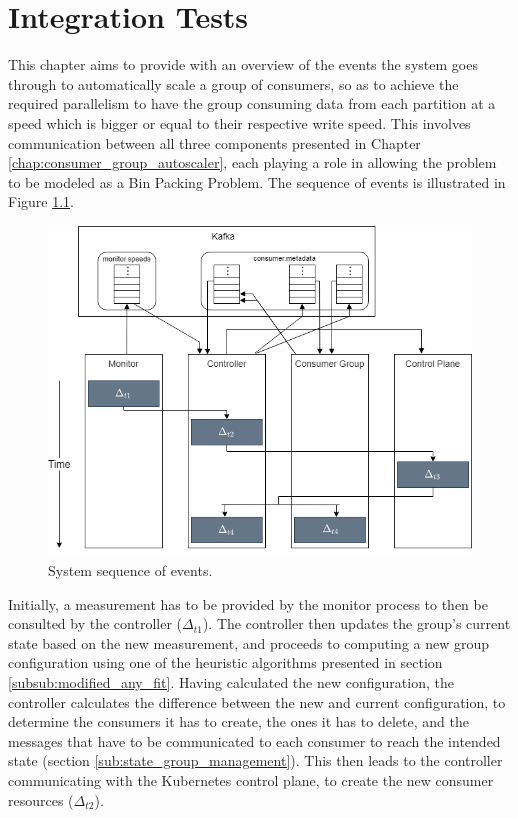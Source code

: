 \chapter{Integration Tests} 
\label{chap:integration_tests}

This chapter aims to provide with an overview of the events the system goes
through to automatically scale a group of consumers, so as to achieve the
required parallelism to have the group consuming data from each partition at a
speed which is bigger or equal to their respective write speed. This involves
communication between all three components presented in Chapter
\ref{chap:consumer_group_autoscaler}, each playing a role in allowing the
problem to be modeled as a Bin Packing Problem. The sequence of events is
illustrated in Figure \ref{fig:step_event_sequence}.

\begin{figure}[htb!]
\centering
\includegraphics[width=\textwidth]{images/integration/Integration_diagram.png}
\caption{System sequence of events.}
\label{fig:step_event_sequence}
\end{figure}

Initially, a measurement has to be provided by the monitor process to then be
consulted by the controller ($\Delta_{t1}$). The controller then updates the
group's current state based on the new measurement, and proceeds to computing a
new group configuration using one of the heuristic algorithms presented in
section \ref{subsub:modified_any_fit}.  Having calculated the new configuration,
the controller calculates the difference between the new and current
configuration, to determine the consumers it has to create, the ones it has to
delete, and the messages that have to be communicated to each consumer to reach
the intended state (section \ref{sub:state_group_management}). This then leads
to the controller communicating with the Kubernetes control plane, to create the
new consumer resources ($\Delta_{t2}$). 

